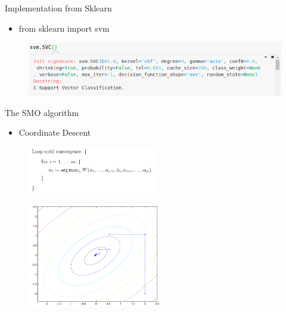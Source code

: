 \documentclass{beamer}
\begin{document}
\begin{frame}{Implementation from Sklearn}
\begin{itemize}
\item from sklearn import svm
\end{itemize}
\begin{figure}
	\includegraphics[width=\textwidth]{images/sk_svc.png}
\end{figure}
\end{frame}

\begin{frame}{The SMO algorithm}
\begin{itemize}
\item Coordinate Descent
\end{itemize}
\begin{figure}
\includegraphics[height=2cm]{images/img9.png}
\end{figure}
\begin{figure}
\includegraphics[height=4.6cm]{images/img8.png}
\end{figure}
\end{frame}
\end{document}
